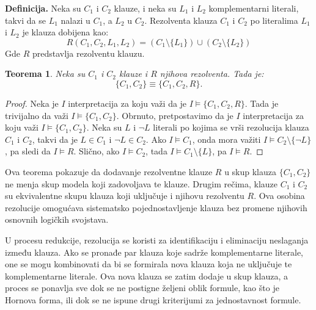 \documentclass[12pt,oneside]{memoir}
\newtheorem{theorem}{Teorema}
\begin{document}
\textbf{Definicija.} Neka su \( C_1 \) i \( C_2 \) klauze, i neka su \( L_1 \) i \( L_2 \) komplementarni literali, takvi da se \( L_1 \) nalazi u \( C_1 \), a \( L_2 \) u \( C_2 \). Rezolventa klauza \( C_1 \) i \( C_2 \) po literalima \( L_1 \) i \( L_2 \) je klauza dobijena kao:
\[
R(C_1, C_2, L_1, L_2) = \left(C_1 \setminus \{L_1\}\right) \cup \left(C_2 \setminus \{L_2\}\right)
\]
Gde \( R \) predstavlja rezolventu klauzu.\\


\begin{theorem}
Neka su \( C_1 \) i \( C_2 \) klauze i \( R \) njihova rezolventa. Tada je:
\[
\{C_1, C_2\} \equiv \{C_1, C_2, R\}
\text{.}
\]
\end{theorem}

\begin{proof}
Neka je $I$ interpretacija za koju važi da je $I \models \{C_1, C_2, R\}$. Tada je trivijalno da važi $I \models \{C_1, C_2\}$. Obrnuto, pretpostavimo da je $I$ interpretacija za koju važi $I \models \{C_1, C_2\}$. Neka su $L$ i $\neg L$ literali po kojima se vrši rezolucija klauza $C_1$ i $C_2$, takvi da je $L \in C_1$ i $\neg L \in C_2$. Ako $I \models C_1$, onda mora važiti $I \models C_2 \setminus \{\neg L\}$, pa sledi da $I \models R$. Slično, ako $I \models C_2$, tada $I \models C_1 \setminus \{L\}$, pa $I \models R$.

\end{proof}
Ova teorema pokazuje da dodavanje rezolventne klauze \( R \) u skup klauza \( \{C_1, C_2\} \) ne menja skup modela koji zadovoljava te klauze. Drugim rečima, klauze \( C_1 \) i \( C_2 \) su ekvivalentne skupu klauza koji uključuje i njihovu rezolventu \( R \). Ova osobina rezolucije omogućava sistematsko pojednostavljenje klauza bez promene njihovih osnovnih logičkih svojstava.


U procesu redukcije, rezolucija se koristi za identifikaciju i eliminaciju neslaganja između klauza. Ako se pronađe par klauza koje sadrže komplementarne literale, one se mogu kombinovati da bi se formirala nova klauza koja ne uključuje te komplementarne literale. Ova nova klauza se zatim dodaje u skup klauza, a proces se ponavlja sve dok se ne postigne željeni oblik formule, kao što je Hornova forma, ili dok se ne ispune drugi kriterijumi za jednostavnost formule.
\end{document}
